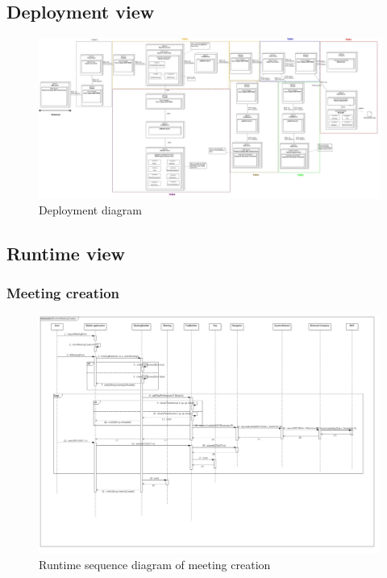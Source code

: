\documentclass[a4paper,leqno]{article}
\begin{document}
\newpage
\subsection{Deployment view}
\begin{figure}[!h]
	\centering
	\begin{center}
		\includegraphics[scale=0.225, angle = 90]{TravlendarPlusDeploymentDiagramTiers_19112017_1}
	\end{center}
       \caption{Deployment diagram}
\end{figure}


\newpage
\subsection{Runtime view}

\subsubsection{Meeting creation}

\begin{figure}[!h]
	\centering
	\begin{center}
		\includegraphics[scale=0.2, angle = 90]{RuntimeMeetingCreation_191117_1}
	\end{center}
	\caption{Runtime sequence diagram of meeting creation}
\end{figure}
\end{document}
